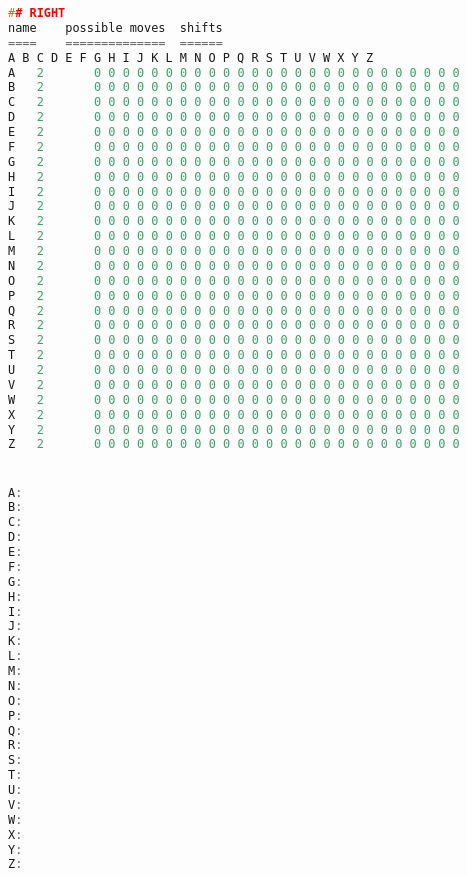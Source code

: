 \documentclass[a4paper,10pt,ngerman]{scrartcl}
\begin{document}
\begin{lstlisting}[language=C++]
## RIGHT
name	possible moves	shifts
====	==============	======
A B C D E F G H I J K L M N O P Q R S T U V W X Y Z
A	2		0 0 0 0 0 0 0 0 0 0 0 0 0 0 0 0 0 0 0 0 0 0 0 0 0 0
B	2		0 0 0 0 0 0 0 0 0 0 0 0 0 0 0 0 0 0 0 0 0 0 0 0 0 0
C	2		0 0 0 0 0 0 0 0 0 0 0 0 0 0 0 0 0 0 0 0 0 0 0 0 0 0
D	2		0 0 0 0 0 0 0 0 0 0 0 0 0 0 0 0 0 0 0 0 0 0 0 0 0 0
E	2		0 0 0 0 0 0 0 0 0 0 0 0 0 0 0 0 0 0 0 0 0 0 0 0 0 0
F	2		0 0 0 0 0 0 0 0 0 0 0 0 0 0 0 0 0 0 0 0 0 0 0 0 0 0
G	2		0 0 0 0 0 0 0 0 0 0 0 0 0 0 0 0 0 0 0 0 0 0 0 0 0 0
H	2		0 0 0 0 0 0 0 0 0 0 0 0 0 0 0 0 0 0 0 0 0 0 0 0 0 0
I	2		0 0 0 0 0 0 0 0 0 0 0 0 0 0 0 0 0 0 0 0 0 0 0 0 0 0
J	2		0 0 0 0 0 0 0 0 0 0 0 0 0 0 0 0 0 0 0 0 0 0 0 0 0 0
K	2		0 0 0 0 0 0 0 0 0 0 0 0 0 0 0 0 0 0 0 0 0 0 0 0 0 0
L	2		0 0 0 0 0 0 0 0 0 0 0 0 0 0 0 0 0 0 0 0 0 0 0 0 0 0
M	2		0 0 0 0 0 0 0 0 0 0 0 0 0 0 0 0 0 0 0 0 0 0 0 0 0 0
N	2		0 0 0 0 0 0 0 0 0 0 0 0 0 0 0 0 0 0 0 0 0 0 0 0 0 0
O	2		0 0 0 0 0 0 0 0 0 0 0 0 0 0 0 0 0 0 0 0 0 0 0 0 0 0
P	2		0 0 0 0 0 0 0 0 0 0 0 0 0 0 0 0 0 0 0 0 0 0 0 0 0 0
Q	2		0 0 0 0 0 0 0 0 0 0 0 0 0 0 0 0 0 0 0 0 0 0 0 0 0 0
R	2		0 0 0 0 0 0 0 0 0 0 0 0 0 0 0 0 0 0 0 0 0 0 0 0 0 0
S	2		0 0 0 0 0 0 0 0 0 0 0 0 0 0 0 0 0 0 0 0 0 0 0 0 0 0
T	2		0 0 0 0 0 0 0 0 0 0 0 0 0 0 0 0 0 0 0 0 0 0 0 0 0 0
U	2		0 0 0 0 0 0 0 0 0 0 0 0 0 0 0 0 0 0 0 0 0 0 0 0 0 0
V	2		0 0 0 0 0 0 0 0 0 0 0 0 0 0 0 0 0 0 0 0 0 0 0 0 0 0
W	2		0 0 0 0 0 0 0 0 0 0 0 0 0 0 0 0 0 0 0 0 0 0 0 0 0 0
X	2		0 0 0 0 0 0 0 0 0 0 0 0 0 0 0 0 0 0 0 0 0 0 0 0 0 0
Y	2		0 0 0 0 0 0 0 0 0 0 0 0 0 0 0 0 0 0 0 0 0 0 0 0 0 0
Z	2		0 0 0 0 0 0 0 0 0 0 0 0 0 0 0 0 0 0 0 0 0 0 0 0 0 0


A:
B:
C:
D:
E:
F:
G:
H:
I:
J:
K:
L:
M:
N:
O:
P:
Q:
R:
S:
T:
U:
V:
W:
X:
Y:
Z:
\end{lstlisting}
\end{document}
